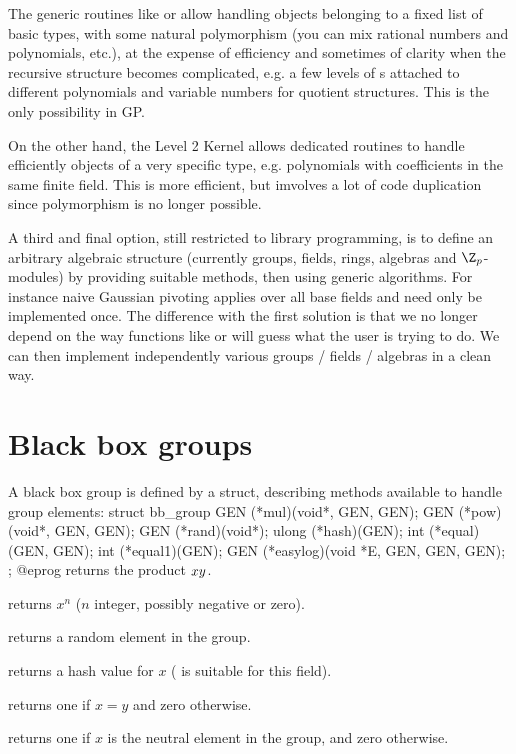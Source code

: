 The generic routines like  or  allow handling objects
belonging to a fixed list of basic types, with some natural polymorphism
(you can mix rational numbers and polynomials, etc.), at the expense of
efficiency and sometimes of clarity when the recursive structure becomes
complicated, e.g. a few levels of s attached to different
polynomials and variable numbers for quotient structures. This
is the only possibility in GP.

On the other hand, the Level 2 Kernel allows dedicated routines to handle
efficiently objects of a very specific type, e.g. polynomials with
coefficients in the same finite field. This is more efficient, but imvolves a
lot of code duplication since polymorphism is no longer possible.

A third and final option, still restricted to library programming, is to
define an arbitrary algebraic structure (currently groups, fields, rings,
algebras and $\Z_p$-modules) by providing suitable methods, then using generic
algorithms. For instance naive Gaussian pivoting applies over all base fields
and need only be implemented once. The difference with the first solution
is that we no longer depend on the way functions like  or
 will guess what the user is trying to do. We can then implement
independently various groups / fields / algebras in a clean way.

\section{Black box groups}

A black box group is defined by a  struct, describing methods
available to handle group elements:
\bprog
    struct bb_group
    {
      GEN (*mul)(void*, GEN, GEN);
      GEN (*pow)(void*, GEN, GEN);
      GEN (*rand)(void*);
      ulong (*hash)(GEN);
      int (*equal)(GEN, GEN);
      int (*equal1)(GEN);
      GEN (*easylog)(void *E, GEN, GEN, GEN);
    };
@eprog
 returns the product $x\*y$.

 returns $x^n$ ($n$ integer, possibly negative or zero).

 returns a random element in the group.

 returns a hash value for $x$ ( is suitable for this field).

 returns one if $x=y$ and zero otherwise.

 returns one if $x$ is the neutral element in the group,
and zero otherwise.

